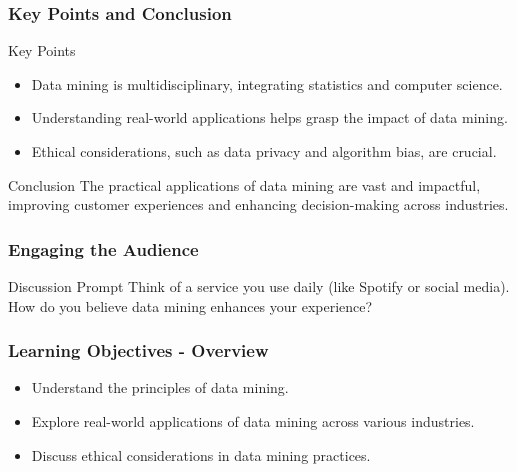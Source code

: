\documentclass[aspectratio=169]{beamer}
\begin{document}
\begin{frame}[fragile]
    \frametitle{Key Points and Conclusion}
    
    \begin{block}{Key Points}
        \begin{itemize}
            \item Data mining is multidisciplinary, integrating statistics and computer science.
            \item Understanding real-world applications helps grasp the impact of data mining.
            \item Ethical considerations, such as data privacy and algorithm bias, are crucial.
        \end{itemize}
    \end{block}

    \begin{block}{Conclusion}
        The practical applications of data mining are vast and impactful, improving customer experiences and enhancing decision-making across industries. 
    \end{block}
\end{frame}

\begin{frame}[fragile]
    \frametitle{Engaging the Audience}
    
    \begin{block}{Discussion Prompt}
        Think of a service you use daily (like Spotify or social media). How do you believe data mining enhances your experience?
    \end{block}
\end{frame}

\begin{frame}[fragile]
    \frametitle{Learning Objectives - Overview}
    \begin{itemize}
        \item Understand the principles of data mining.
        \item Explore real-world applications of data mining across various industries.
        \item Discuss ethical considerations in data mining practices.
    \end{itemize}
\end{frame}
\end{document}
